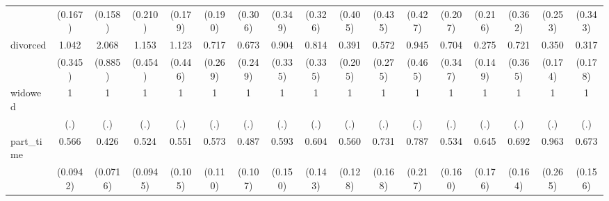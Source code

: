 {\begin{tabular}{l*{16}{c}}
                    &     (0.167)         &     (0.158)         &     (0.210)         &     (0.179)         &     (0.190)         &     (0.306)         &     (0.349)         &     (0.326)         &     (0.405)         &     (0.435)         &     (0.427)         &     (0.207)         &     (0.216)         &     (0.362)         &     (0.253)         &     (0.343)         \\
[1em]
divorced            &       1.042         &       2.068         &       1.153         &       1.123         &       0.717         &       0.673         &       0.904         &       0.814         &       0.391         &       0.572         &       0.945         &       0.704         &       0.275\sym{*}  &       0.721         &       0.350\sym{*}  &       0.317\sym{*}  \\
                    &     (0.345)         &     (0.885)         &     (0.454)         &     (0.446)         &     (0.269)         &     (0.249)         &     (0.335)         &     (0.335)         &     (0.205)         &     (0.275)         &     (0.465)         &     (0.347)         &     (0.149)         &     (0.365)         &     (0.174)         &     (0.178)         \\
[1em]
widowed             &           1         &           1         &           1         &           1         &           1         &           1         &           1         &           1         &           1         &           1         &           1         &           1         &           1         &           1         &           1         &           1         \\
                    &         (.)         &         (.)         &         (.)         &         (.)         &         (.)         &         (.)         &         (.)         &         (.)         &         (.)         &         (.)         &         (.)         &         (.)         &         (.)         &         (.)         &         (.)         &         (.)         \\
[1em]
part\_time           &       0.566\sym{***}&       0.426\sym{***}&       0.524\sym{***}&       0.551\sym{**} &       0.573\sym{**} &       0.487\sym{**} &       0.593\sym{*}  &       0.604\sym{*}  &       0.560\sym{*}  &       0.731         &       0.787         &       0.534\sym{*}  &       0.645         &       0.692         &       0.963         &       0.673         \\
                    &    (0.0942)         &    (0.0716)         &    (0.0945)         &     (0.105)         &     (0.110)         &     (0.107)         &     (0.150)         &     (0.143)         &     (0.128)         &     (0.168)         &     (0.217)         &     (0.160)         &     (0.176)         &     (0.164)         &     (0.265)         &     (0.156)         \\

\end{tabular}}
